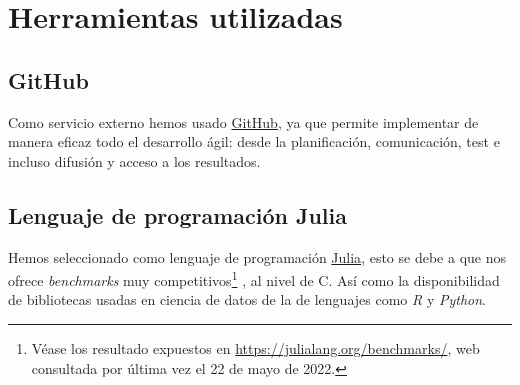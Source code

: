 
\section{Herramientas utilizadas}

\subsection{GitHub}
Como servicio externo hemos usado \href{https://github.com}{GitHub}, ya que permite implementar de manera eficaz
 todo el desarrollo ágil: 
desde la planificación, comunicación, test e incluso difusión y acceso a los resultados. 

\subsection{Lenguaje de programación Julia}
Hemos seleccionado como lenguaje de programación \href{https://julialang.org}{Julia}, 
esto se debe a que nos ofrece \textit{benchmarks} muy competitivos\footnote{Véase los resultado expuestos en 
\url{https://julialang.org/benchmarks/}, web consultada por última vez el 22 de mayo de 2022.} 
, al nivel de C. Así como la disponibilidad  de bibliotecas usadas en ciencia de datos de  
la de lenguajes como \textit{R} y \textit{Python}. 